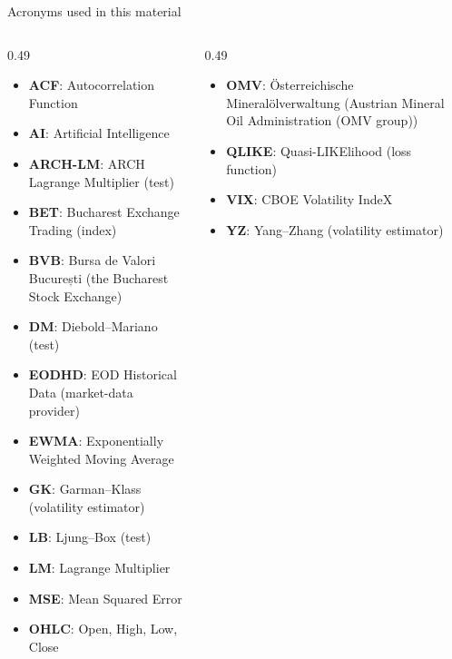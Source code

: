 
{
\begin{frame}[noframenumbering]
    \titlepage
\end{frame}
}
\begin{frame}{Acronyms used in this material}
\begin{columns}[T]
\begin{column}{0.49\textwidth}
\begin{itemize}\setlength{\itemsep}{0pt}
    \item \textbf{ACF}: Autocorrelation Function
    \item \textbf{AI}: Artificial Intelligence
    \item \textbf{ARCH-LM}: ARCH Lagrange Multiplier (test)
    \item \textbf{BET}: Bucharest Exchange Trading (index)
    \item \textbf{BVB}: Bursa de Valori București (the Bucharest Stock Exchange)
    \item \textbf{DM}: Diebold–Mariano (test)
    \item \textbf{EODHD}: EOD Historical Data (market-data provider)
    \item \textbf{EWMA}: Exponentially Weighted Moving Average
    \item \textbf{GK}: Garman–Klass (volatility estimator)
    \item \textbf{LB}: Ljung–Box (test)
    \item \textbf{LM}: Lagrange Multiplier
    \item \textbf{MSE}: Mean Squared Error
    \item \textbf{OHLC}: Open, High, Low, Close
\end{itemize}
\end{column}
\begin{column}{0.49\textwidth}
\begin{itemize}\setlength{\itemsep}{0pt}
    \item \textbf{OMV}: Österreichische Mineralölverwaltung (Austrian Mineral Oil Administration (OMV group))
    \item \textbf{QLIKE}: Quasi-LIKElihood (loss function)
    \item \textbf{VIX}: CBOE Volatility IndeX
    \item \textbf{YZ}: Yang–Zhang (volatility estimator)
\end{itemize}
\end{column}
\end{columns}
\end{frame}


